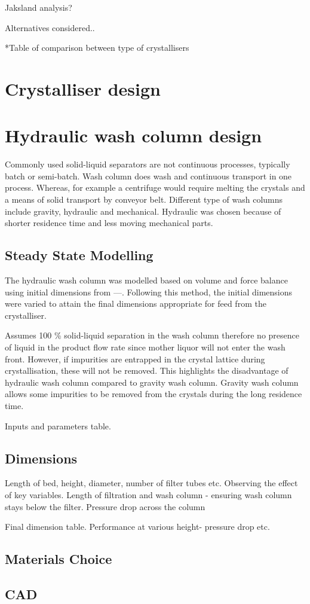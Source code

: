 Jaksland analysis?

Alternatives considered..

*Table of comparison between type of crystallisers

 




\section{Crystalliser design}




\section{Hydraulic wash column design}

Commonly used solid-liquid separators are not continuous processes, typically batch or semi-batch. Wash column does wash and continuous transport in one process. Whereas, for example a centrifuge would require  melting the crystals and a means of solid transport by conveyor belt. Different type of wash columns include gravity, hydraulic and mechanical. Hydraulic was chosen because of shorter residence time and less moving mechanical parts. 

\subsection{Steady State Modelling}
The hydraulic wash column was modelled based on volume and force balance using initial dimensions from ---. Following this method, the initial dimensions were varied to attain the final dimensions appropriate for feed from the crystalliser. 

Assumes 100 \% solid-liquid separation in the wash column therefore no presence of liquid in the product flow rate since mother liquor will not enter the wash front. However, if impurities are entrapped in the crystal lattice during crystallisation, these will not be removed. This highlights the disadvantage of hydraulic wash column compared to gravity wash column. Gravity wash column allows some impurities to be removed from the crystals during the long residence time. 

Inputs and parameters table. 

\subsection{Dimensions}
Length of bed, height, diameter, number of filter tubes etc. Observing the effect of key variables. Length of filtration and wash column - ensuring wash column stays below the filter. Pressure drop across the column

Final dimension table. 
Performance at various height- pressure drop etc. 


\subsection{Materials Choice}

\subsection{CAD}

